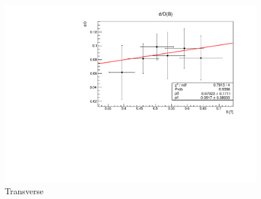 \documentclass[a4paper,12pt,abstracton]{scrartcl}
\begin{document}
\begin{figure}[H]
     \centering
     \includegraphics[scale=0.76]{plots/zat.pdf}
    \caption{Transverse}
    \label{fig:zat}
\end{figure}
\end{document}
